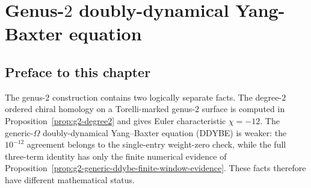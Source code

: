 %
%

\providecommand{\cA}{\mathcal{A}}
\providecommand{\cC}{\mathcal{C}}
\providecommand{\cL}{\mathcal{L}}
\providecommand{\cM}{\mathcal{M}}
\providecommand{\CC}{\mathbb{C}}
\providecommand{\ZZ}{\mathbb{Z}}
\providecommand{\RR}{\mathbb{R}}
\providecommand{\HHH}{\mathbb{H}}
\providecommand{\fh}{\mathfrak{h}}
\providecommand{\fsl}{\mathfrak{sl}}
\providecommand{\Conf}{\mathrm{Conf}}
\providecommand{\FM}{\overline{\mathrm{FM}}}
\providecommand{\End}{\mathrm{End}}
\providecommand{\ClaimStatusProvedHere}{\textsf{ProvedHere}}
\providecommand{\ClaimStatusProvedElsewhere}{\textsf{ProvedElsewhere}}
\providecommand{\ClaimStatusConjectured}{\textsf{Conjectured}}
\providecommand{\ClaimStatusNumericalEvidence}{\textsf{NumericalEvidence}}

\chapter[Genus-$2$ doubly-dynamical Yang-Baxter]
{Genus-$2$ doubly-dynamical Yang-Baxter equation}
\label{ch:genus-2-ddybe-platonic}

\section*{Preface to this chapter}

The genus-$2$ construction contains two logically separate facts.
The degree-$2$ ordered chiral homology on a Torelli-marked genus-$2$
surface is computed in Proposition~\ref{prop:g2-degree2} and gives
Euler characteristic $\chi=-12$. The generic-$\Omega$
doubly-dynamical Yang--Baxter equation (DDYBE) is weaker: the
$10^{-12}$ agreement belongs to the single-entry weight-zero check,
while the full three-term identity has only the finite numerical
evidence of
Proposition~\ref{prop:g2-generic-ddybe-finite-window-evidence}.
These facts therefore have different mathematical status.

